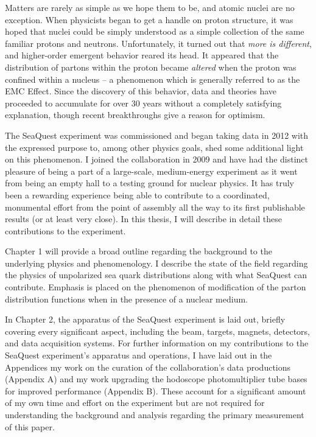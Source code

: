 \documentclass[edeposit,fullpage]{uiucthesis2009}
\begin{document}
Matters are rarely as simple as we hope them to be, and atomic nuclei are no exception. When physicists began to get a handle on proton structure, it was hoped that nuclei could be simply understood as a simple collection of the same familiar protons and neutrons. Unfortunately, it turned out that \emph{more is different}, and higher-order emergent behavior reared its head. It appeared that the distribution of partons within the proton became \emph{altered} when the proton was confined within a nucleus -- a phenomenon which is generally referred to as the EMC Effect. Since the discovery of this behavior, data and theories have proceeded to accumulate for over 30 years without a completely satisfying explanation, though recent breakthroughs give a reason for optimism.

The SeaQuest experiment was commissioned and began taking data in 2012 with the expressed purpose to, among other physics goals, shed some additional light on this phenomenon. I joined the collaboration in 2009 and have had the distinct pleasure of being a part of a large-scale, medium-energy experiment as it went from being an empty hall to a testing ground for nuclear physics. It has truly been a rewarding experience being able to contribute to a coordinated, monumental effort from the point of assembly all the way to its first publishable results (or at least very close). In this thesis, I will describe in detail these contributions to the experiment. 

Chapter 1 will provide a broad outline regarding the background to the underlying physics and phenomenology. I describe the state of the field regarding the physics of unpolarized sea quark distributions along with what SeaQuest can contribute. Emphasis is placed on the phenomenon of modification of the parton distribution functions when in the presence of a nuclear medium.

In Chapter 2, the apparatus of the SeaQuest experiment is laid out, briefly covering every significant aspect, including the beam, targets, magnets, detectors, and data acquisition systems. For further information on my contributions to the SeaQuest experiment's apparatus and operations, I have laid out in the Appendices my work on the curation of the collaboration's data productions (Appendix A) and my work upgrading the hodoscope photomultiplier tube bases for improved performance (Appendix B). These account for a significant amount of my own time and effort on the experiment but are not required for understanding the background and analysis regarding the primary measurement of this paper.
\end{document}
